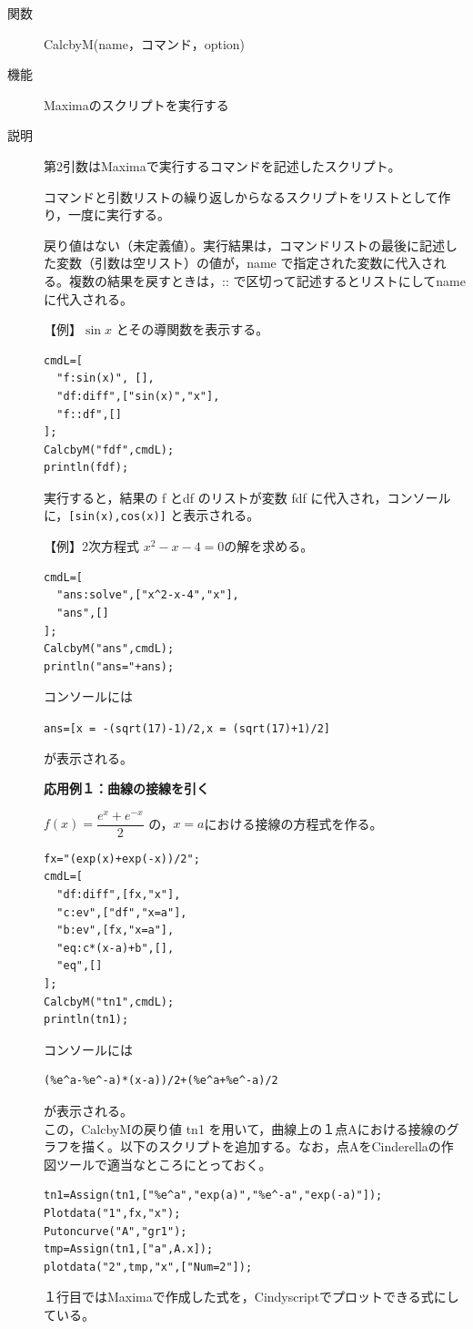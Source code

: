 \documentclass[papersize,a4paper,12pt,uplatex]{jsarticle}
\begin{document}
\begin{description}

\hypertarget{calcbyM}{}
\item[関数]CalcbyM(name，コマンド，option)
\item[機能]Maximaのスクリプトを実行する
\item[説明]第2引数はMaximaで実行するコマンドを記述したスクリプト。

コマンドと引数リストの繰り返しからなるスクリプトをリストとして作り，一度に実行する。

戻り値はない（未定義値）。実行結果は，コマンドリストの最後に記述した変数（引数は空リスト）の値が，name で指定された変数に代入される。複数の結果を戻すときは，:: で区切って記述するとリストにしてnameに代入される。

\vspace{\baselineskip}
【例】$\sin x$ とその導関数を表示する。
\begin{verbatim}
cmdL=[
  "f:sin(x)", [],
  "df:diff",["sin(x)","x"],
  "f::df",[]
];
CalcbyM("fdf",cmdL);
println(fdf);
\end{verbatim}
\vspace{\baselineskip}
実行すると，結果の f とdf のリストが変数 fdf に代入され，コンソールに，\verb|[sin(x),cos(x)]| と表示される。

\vspace{\baselineskip}
【例】2次方程式 $x^2-x-4=0$の解を求める。
\begin{verbatim}
cmdL=[
  "ans:solve",["x^2-x-4","x"],
  "ans",[]
];
CalcbyM("ans",cmdL);
println("ans="+ans);
\end{verbatim}
コンソールには

\verb|ans=[x = -(sqrt(17)-1)/2,x = (sqrt(17)+1)/2] |

が表示される。

\vspace{\baselineskip}
{\bf 応用例１：曲線の接線を引く}

\vspace{\baselineskip}
$f(x)=\dfrac{e^x+e^{-x}}{2}$ の，$x=a$における接線の方程式を作る。

\begin{verbatim}
fx="(exp(x)+exp(-x))/2";
cmdL=[
  "df:diff",[fx,"x"],
  "c:ev",["df","x=a"],
  "b:ev",[fx,"x=a"],
  "eq:c*(x-a)+b",[],
  "eq",[]
];
CalcbyM("tn1",cmdL);
println(tn1);
\end{verbatim}
コンソールには
\begin{verbatim}
(%e^a-%e^-a)*(x-a))/2+(%e^a+%e^-a)/2 
\end{verbatim}
が表示される。\\
この，CalcbyMの戻り値 tn1 を用いて，曲線上の１点Aにおける接線のグラフを描く。以下のスクリプトを追加する。なお，点AをCinderellaの作図ツールで適当なところにとっておく。
\begin{verbatim}
tn1=Assign(tn1,["%e^a","exp(a)","%e^-a","exp(-a)"]);
Plotdata("1",fx,"x");
Putoncurve("A","gr1");
tmp=Assign(tn1,["a",A.x]);
plotdata("2",tmp,"x",["Num=2"]);
\end{verbatim}
１行目ではMaximaで作成した式を，Cindyscriptでプロットできる式にしている。


\end{description}
\end{document}
